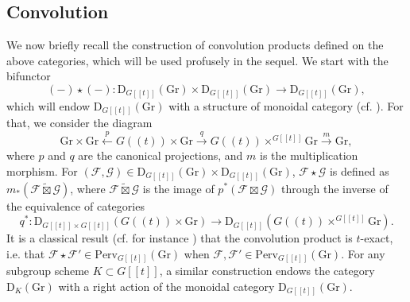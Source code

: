 \documentclass[11pt]{amsart}
\theoremstyle{plain}
\theoremstyle{remark}
\numberwithin{equation}{section}
\begin{document}
	\subsection{Convolution}
	We now briefly recall the construction of convolution products defined on the above categories, which will be used profusely in the sequel. We start with the bifunctor 
	\begin{equation}\label{eq monoid}
	    (-)\star(-):\mathrm{D}_{G[[t]]}(\mathrm{Gr})\times \mathrm{D}_{G[[t]]}(\mathrm{Gr})\to \mathrm{D}_{G[[t]]}(\mathrm{Gr}), 
	\end{equation}
	which will endow $\mathrm{D}_{G[[t]]}(\mathrm{Gr})$ with a structure of monoidal category (cf. \cite[§3.2.2]{BG}). For that, we consider the diagram
	\begin{equation}\label{conv diagram}
		\mathrm{Gr}\times\mathrm{Gr}\xleftarrow{p}G((t))\times \mathrm{Gr}\xrightarrow{q} G((t))\times^{G[[t]]} \mathrm{Gr}\xrightarrow{m}\mathrm{Gr}, 
	\end{equation}
	where $p$ and $q$ are the canonical projections, and $m$ is the multiplication morphism. For $(\mathcal{F},\mathcal{G})\in \mathrm{D}_{G[[t]]}(\mathrm{Gr})\times  \mathrm{D}_{G[[t]]}(\mathrm{Gr})$, $\mathcal{F}\star\mathcal{G}$ is defined as $m_*(\mathcal{F}\widetilde{\boxtimes}\mathcal{G})$, where $\mathcal{F}\widetilde{\boxtimes}\mathcal{G}$ is the image of $p^*(\mathcal{F}\boxtimes\mathcal{G})$ through the inverse of the equivalence of categories
	$$q^*:\mathrm{D}_{G[[t]]\times G[[t]]}(G((t))\times \mathrm{Gr})\to  \mathrm{D}_{G[[t]]}(G((t))\times^{G[[t]]} \mathrm{Gr}).$$
	It is a classical result (cf. for instance \cite[§6.3]{baumann:hal-01491529}) that the convolution product is $t$-exact, i.e. that $\mathcal{F}\star\mathcal{F}'\in \mathrm{Perv}_{G[[t]]}(\mathrm{Gr})$ when $\mathcal{F},\mathcal{F}'\in \mathrm{Perv}_{G[[t]]}(\mathrm{Gr})$. For any subgroup scheme $K\subset G[[t]]$, a similar construction endows the category $\mathrm{D}_{K}(\mathrm{Gr})$ with a right action of the monoidal category $\mathrm{D}_{G[[t]]}(\mathrm{Gr})$.
	
\end{document}
